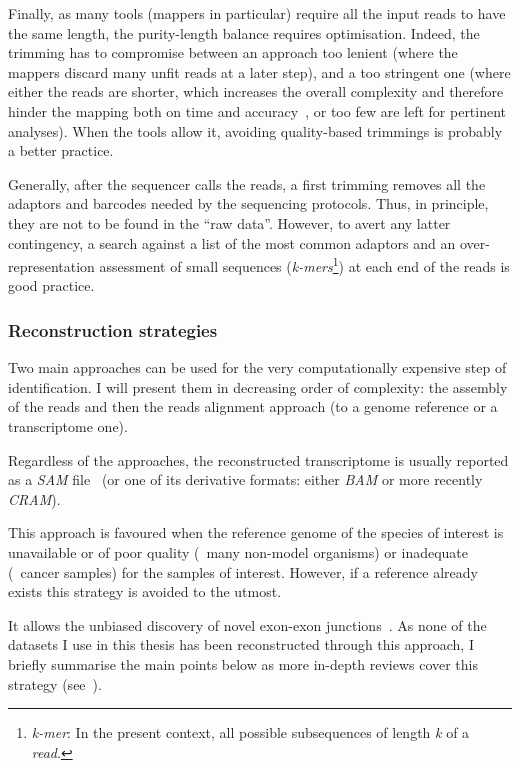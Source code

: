 Finally, as many tools (mappers in particular) require all the input reads
to have the same length, the purity-length balance requires optimisation.
Indeed, the trimming has to compromise between an approach too lenient
(where the mappers discard many unfit reads at a later step),
and a too stringent one (where either the reads are shorter,
which increases the overall complexity and therefore hinder
the mapping both on time and accuracy~,
or too few are left for pertinent analyses).
When the tools allow it, avoiding quality-based trimmings is probably
a better practice.\mybr\

Generally, after the sequencer calls the reads, a first trimming removes
all the adaptors and barcodes needed by the sequencing protocols. Thus,
in principle, they are not to be found in the \enquote{raw data}.
However, to avert any latter contingency, a search against
a list of the most common adaptors and an over-representation assessment of small
sequences (\emph{k-mers}\footnote{\emph{k-mer}: In the present context, all
possible subsequences of length
\emph{k} of a \emph{read}.}) at each end of the reads is good practice.\mybr\


\subsubsection{Reconstruction strategies}\label{subsec:reconstruction}

Two main approaches can be used for the very computationally expensive step of
identification. I will present them in decreasing order of complexity:
the  assembly of the reads and then the reads alignment approach
(to a genome reference or a transcriptome one).\mybr\

Regardless of the approaches, the reconstructed transcriptome is usually reported
as a \emph{\gls{SAM}} file~ (or one of its derivative formats:
either \emph{\gls{BAM}} or more recently \emph{CRAM}).\mybr\


This approach is favoured when the reference genome of the species of interest
is unavailable or of poor quality
(\eg\ many non-model organisms) or inadequate (\eg\ cancer samples)
for the samples of interest. However, if a reference already exists this strategy
is avoided to the utmost.\mybr\

It allows the unbiased discovery of novel
exon-exon junctions~. As none of the datasets I use in this
thesis has been reconstructed through this approach, I briefly summarise
the main points below as more in-depth reviews cover this strategy
(see~\cite{denovoReview}).\mybr\

